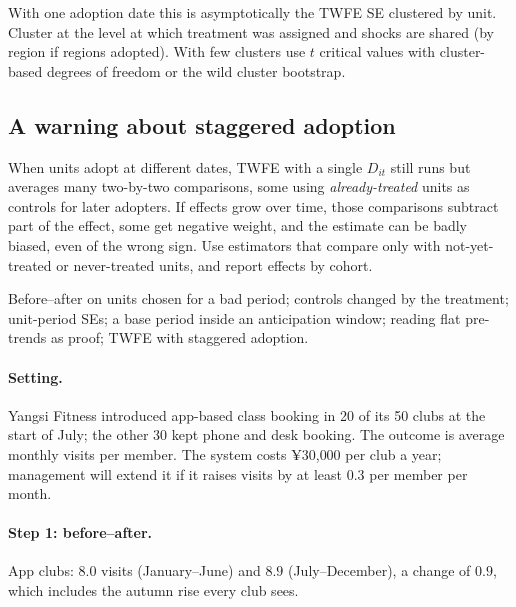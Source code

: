 \documentclass[11pt]{article}
\begin{document}
With one adoption date this is asymptotically the TWFE SE clustered by unit. Cluster at the level at which treatment was assigned and shocks are
shared (by region if regions adopted). With few clusters use $t$ critical values with cluster-based degrees of freedom or the wild cluster
bootstrap.

\subsection{A warning about staggered adoption}

When units adopt at different dates, TWFE with a single $D_{it}$ still runs but averages many two-by-two comparisons, some using
\emph{already-treated} units as controls for later adopters. If effects grow over time, those comparisons subtract part of the effect, some get
negative weight, and the estimate can be badly biased, even of the wrong sign. Use estimators that compare only with not-yet-treated or
never-treated units, and report effects by cohort.

\begin{pitfall}
Before--after on units chosen for a bad period; controls changed by the treatment; unit-period SEs; a base period inside an anticipation window;
reading flat pre-trends as proof; TWFE with staggered adoption.
\end{pitfall}

\sectiontwo

\paragraph{Setting.} Yangsi Fitness introduced app-based class booking in 20 of its 50 clubs at the start of July; the other 30 kept phone and desk
booking. The outcome is average monthly visits per member. The system costs ¥30{,}000 per club a year; management will extend it if it raises
visits by at least $0.3$ per member per month.

\paragraph{Step 1: before--after.} App clubs: $8.0$ visits (January--June) and $8.9$ (July--December), a change of $0.9$, which includes the autumn
rise every club sees.
\end{document}
